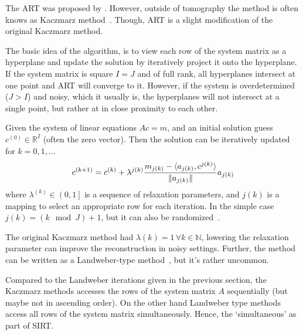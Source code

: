 The \gls{ART} was proposed by \citeauthor{gordon_algebraic_1970}\cite{gordon_algebraic_1970}.
However, outside of tomography the method is often knows as Kaczmarz
method~\cite{kaczmarz_approximate_1993}. Though, \gls{ART} is a slight modification of the original
Kaczmarz method.

The basic idea of the algorithm, is to view each row of the system matrix as a hyperplane and update
the solution by iteratively project it onto the hyperplane. If the system matrix is square \(I = J\)
and of full rank, all hyperplanes intersect at one point and \gls{ART} will converge to it. However, if
the system is overdetermined (\(J > I\)) and noisy, which it usually is, the hyperplanes will not
intersect at a single point, but rather at in close proximity to each other.

\begin{definition}\label{def:art}
	Given the system of linear equations \(Ac = m\), and an initial solution guess \(c^{(0)} \in
	\mathbb{R}^I\) (often the zero vector). Then the solution can be iteratively updated for
	\(k = 0, 1, \dots\)
	\[
		c^{(k+1)} = c^{(k)} + \lambda^{j(k)} \frac{m_{j(k)} - \langle a_{j(k)}, c^{j(k)} \rangle}{\lVert a_{j(k)}\rVert}a_{j(k)}
	\]
        where \(\lambda^{(k)} \in \left(0, 1\right]\) is a sequence of relaxation parameters, and
        \(j(k)\) is a mapping to select an appropriate row for each iteration. In the simple case
        \(j(k) = (k \mod J) + 1\), but it can also be randomized~\cite{strohmer_randomized_2007}.
\end{definition}

The original Kaczmarz method had \(\lambda(k) = 1\, \forall k \in \mathbb{N}\), lowering the
relaxation parameter can improve the reconstruction in noisy settings. Further, the method can be
written as a Landweber-type method~\cite{hansen_discrete_2010}, but it's rather uncommon.

Compared to the Landweber iterations given in the previous section, the Kaczmarz methods accesses
the rows of the system matrix \(A\) sequentially (but maybe not in ascending order). On the other
hand Landweber type methods access all rows of the system matrix simultaneously. Hence, the
`simultaneous' as part of \gls{SIRT}\@.


%
%
%

